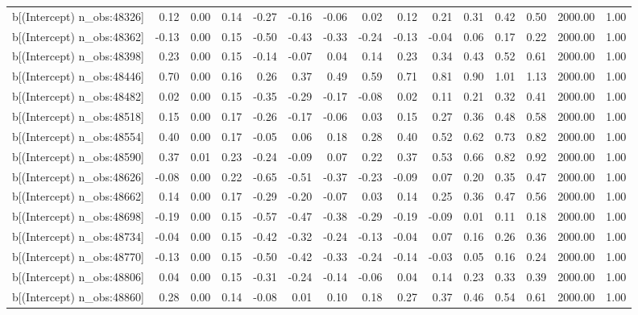 \begin{table}[ht]
\begin{tabular}{rrrrrrrrrrrrrrr}
  b[(Intercept) n\_obs:48326] & 0.12 & 0.00 & 0.14 & -0.27 & -0.16 & -0.06 & 0.02 & 0.12 & 0.21 & 0.31 & 0.42 & 0.50 & 2000.00 & 1.00 \\ 
  b[(Intercept) n\_obs:48362] & -0.13 & 0.00 & 0.15 & -0.50 & -0.43 & -0.33 & -0.24 & -0.13 & -0.04 & 0.06 & 0.17 & 0.22 & 2000.00 & 1.00 \\ 
  b[(Intercept) n\_obs:48398] & 0.23 & 0.00 & 0.15 & -0.14 & -0.07 & 0.04 & 0.14 & 0.23 & 0.34 & 0.43 & 0.52 & 0.61 & 2000.00 & 1.00 \\ 
  b[(Intercept) n\_obs:48446] & 0.70 & 0.00 & 0.16 & 0.26 & 0.37 & 0.49 & 0.59 & 0.71 & 0.81 & 0.90 & 1.01 & 1.13 & 2000.00 & 1.00 \\ 
  b[(Intercept) n\_obs:48482] & 0.02 & 0.00 & 0.15 & -0.35 & -0.29 & -0.17 & -0.08 & 0.02 & 0.11 & 0.21 & 0.32 & 0.41 & 2000.00 & 1.00 \\ 
  b[(Intercept) n\_obs:48518] & 0.15 & 0.00 & 0.17 & -0.26 & -0.17 & -0.06 & 0.03 & 0.15 & 0.27 & 0.36 & 0.48 & 0.58 & 2000.00 & 1.00 \\ 
  b[(Intercept) n\_obs:48554] & 0.40 & 0.00 & 0.17 & -0.05 & 0.06 & 0.18 & 0.28 & 0.40 & 0.52 & 0.62 & 0.73 & 0.82 & 2000.00 & 1.00 \\ 
  b[(Intercept) n\_obs:48590] & 0.37 & 0.01 & 0.23 & -0.24 & -0.09 & 0.07 & 0.22 & 0.37 & 0.53 & 0.66 & 0.82 & 0.92 & 2000.00 & 1.00 \\ 
  b[(Intercept) n\_obs:48626] & -0.08 & 0.00 & 0.22 & -0.65 & -0.51 & -0.37 & -0.23 & -0.09 & 0.07 & 0.20 & 0.35 & 0.47 & 2000.00 & 1.00 \\ 
  b[(Intercept) n\_obs:48662] & 0.14 & 0.00 & 0.17 & -0.29 & -0.20 & -0.07 & 0.03 & 0.14 & 0.25 & 0.36 & 0.47 & 0.56 & 2000.00 & 1.00 \\ 
  b[(Intercept) n\_obs:48698] & -0.19 & 0.00 & 0.15 & -0.57 & -0.47 & -0.38 & -0.29 & -0.19 & -0.09 & 0.01 & 0.11 & 0.18 & 2000.00 & 1.00 \\ 
  b[(Intercept) n\_obs:48734] & -0.04 & 0.00 & 0.15 & -0.42 & -0.32 & -0.24 & -0.13 & -0.04 & 0.07 & 0.16 & 0.26 & 0.36 & 2000.00 & 1.00 \\ 
  b[(Intercept) n\_obs:48770] & -0.13 & 0.00 & 0.15 & -0.50 & -0.42 & -0.33 & -0.24 & -0.14 & -0.03 & 0.05 & 0.16 & 0.24 & 2000.00 & 1.00 \\ 
  b[(Intercept) n\_obs:48806] & 0.04 & 0.00 & 0.15 & -0.31 & -0.24 & -0.14 & -0.06 & 0.04 & 0.14 & 0.23 & 0.33 & 0.39 & 2000.00 & 1.00 \\ 
  b[(Intercept) n\_obs:48860] & 0.28 & 0.00 & 0.14 & -0.08 & 0.01 & 0.10 & 0.18 & 0.27 & 0.37 & 0.46 & 0.54 & 0.61 & 2000.00 & 1.00 \\ 

\end{tabular}
\end{table}
